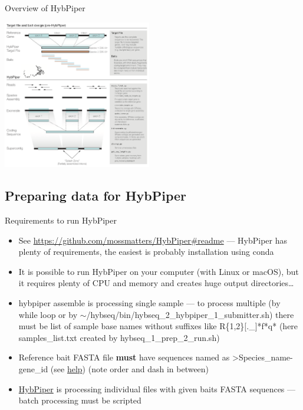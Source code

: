 \documentclass[compress,  xelatex, 11pt, xcolor=x11names, aspectratio=169,
	hyperref={
		bookmarks=true,
		unicode=true,
		colorlinks=true,
		pdftitle={HybSeq course},
		plainpages=false,
		pdfauthor={Vojtech Zeisek},
		pdfsubject={Practical processing of HybSeq target enrichment sequencing data on computing grids like MetaCentrum},
		pdfcreator={XeLaTeX},
		pdfkeywords={BASH, command line, GNU, HybSeq, Linux, MetaCentrum, sequencing shell, target enrichment},
		linkcolor=Turquoise4, %
		anchorcolor=DodgerBlue4, %
		citecolor=DodgerBlue4, %
		filecolor=DodgerBlue4, %
		menucolor=Tan4, %
		urlcolor=DarkOliveGreen4 %
		},
	url={hyphens, lowtilde} %
	]{beamer}
\renewcommand{\texttt}[1]{\colorbox{Cornsilk2}{{\ttfamily #1}}}
\renewcommand{\alert}[1]{\textcolor{OrangeRed3}{#1}}
\begin{document}
\begin{frame}{Overview of HybPiper}
	\begin{center}
		\includegraphics[height=6.5cm]{hybpiper.png}
	\end{center}
\end{frame}

\subsection{Preparing data for HybPiper}

\begin{frame}{Requirements to run HybPiper}
	\begin{itemize}
		\item See \url{https://github.com/mossmatters/HybPiper\#readme} --- HybPiper has plenty of requirements, the easiest is probably installation using \texttt{conda}
		\item It is possible to run HybPiper on your computer (with Linux or macOS), but it requires plenty of CPU and memory and creates huge output directories\ldots
		\item \texttt{hybpiper assemble} is processing single sample --- to process multiple (by \texttt{while} loop or by \texttt{$\sim$/hybseq/bin/hybseq\_2\_hybpiper\_1\_submitter.sh}) there must be list of sample base names without suffixes like \texttt{*[.\_]R\{1,2\}[.\_]*f*q*} (here \texttt{samples\_list.txt} created by \texttt{hybseq\_1\_prep\_2\_run.sh})
		\item Reference bait FASTA file \textbf{must} have sequences named as \texttt{>Species\_name\alert{-}gene\_id} (see \href{https://github.com/mossmatters/HybPiper/wiki\#12-target-file}{help}) (\alert{note} order and dash in between)
		\item \href{https://github.com/mossmatters/HybPiper}{HybPiper} is processing individual files with given baits FASTA sequences --- batch processing must be scripted
	\end{itemize}
\end{frame}
\end{document}
